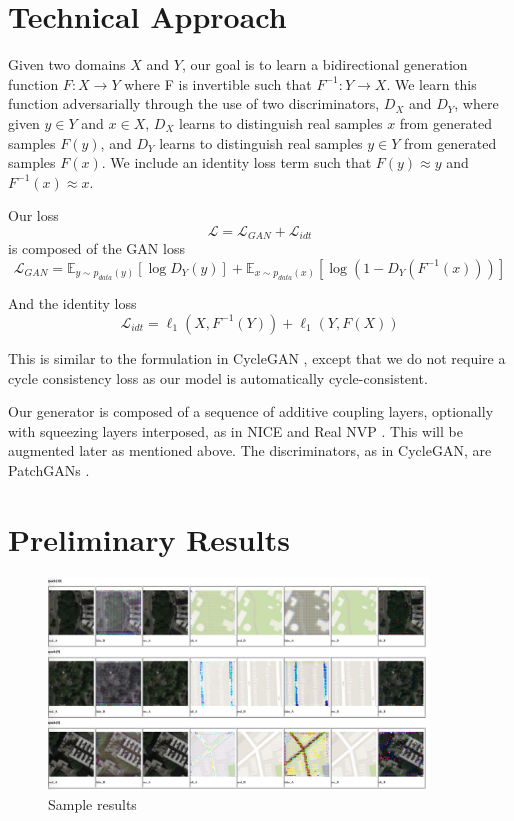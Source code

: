 \documentclass{article}
\begin{document}
\section{Technical Approach}
Given two domains $X$ and $Y$, our goal is to learn a bidirectional generation function $F: X \rightarrow Y$ where F is invertible such that $F^{-1}: Y \rightarrow X$. We learn this function adversarially through the use of two discriminators, $D_X$ and $D_Y$, where given  $y \in Y$ and $x \in X$, $D_X$ learns to distinguish real samples $x$ from generated samples $F(y)$, and $D_Y$ learns to distinguish real samples $y \in Y$ from generated samples $F(x)$. We include an identity loss term such that $F(y) \approx y$ and $F^{-1}(x) \approx x$.

Our loss $$\mathcal{L} = \mathcal{L}_{GAN} + \mathcal{L}_{idt}$$ is composed of the GAN loss $$\mathcal{L}_{GAN} = \mathbb{E}_{y\sim p_{data}(y)}[\log D_Y(y)] + \mathbb{E}_{x\sim p_{data}(x)}[\log (1 - D_Y(F^{-1}(x)))]$$

And the identity loss 
$$\mathcal{L}_{idt} = \ell_1(X, F^{-1}(Y)) + \ell_1(Y, F(X))$$

This is similar to the formulation in CycleGAN \citep{zhu2017unpaired}, except that we do not require a cycle consistency loss as our model is automatically cycle-consistent.

Our generator is composed of a sequence of additive coupling layers, optionally with squeezing layers interposed, as in NICE \citep{dinh2014nice} and Real NVP \citep{dinh2016density}. This will be augmented later as mentioned above.
The discriminators, as in CycleGAN, are PatchGANs \citep{isola2017image}.

\section{Preliminary Results}

\begin{figure}[h]
\centering
\includegraphics[width=0.9\textwidth]{results.png}
\caption{Sample results}
\end{figure} 
\end{document}

